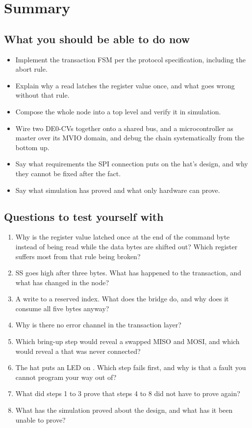 
\section{Summary}
\label{c19:sec:review}

\subsection*{What you should be able to do now}
\begin{itemize}
  \item Implement the transaction FSM per the protocol specification, including the abort rule.
  \item Explain why a read latches the register value once, and what goes wrong without that rule.
  \item Compose the whole node into a top level and verify it in simulation.
  \item Wire two DE0-CVs together onto a shared bus, and a microcontroller as master over its MVIO
    domain, and debug the chain systematically from the bottom up.
  \item Say what requirements the SPI connection puts on the hat's design, and why they cannot be
    fixed after the fact.
  \item Say what simulation has proved and what only hardware can prove.
\end{itemize}

\subsection*{Questions to test yourself with}
\begin{enumerate}
  \item Why is the register value latched once at the end of the command byte instead of being read
    while the data bytes are shifted out? Which register suffers most from that rule being broken?
  \item SS goes high after three bytes. What has happened to the transaction, and what has changed in
    the node?
  \item A write to a reserved index. What does the bridge do, and why does it consume all five bytes
    anyway?
  \item Why is there no error channel in the transaction layer?
  \item Which bring-up step would reveal a swapped MISO and MOSI, and which would reveal a
     that was never connected?
  \item The hat puts an LED on . Which step fails first, and why is that a fault you cannot
    program your way out of?
  \item What did steps 1 to 3 prove that steps 4 to 8 did not have to prove again?
  \item What has the simulation proved about the design, and what has it been unable to prove?
\end{enumerate}

